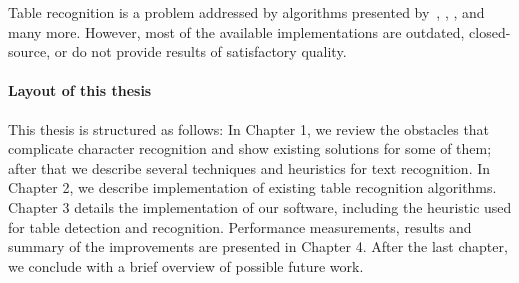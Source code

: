 Table recognition is a problem addressed by algorithms presented by~\citet{tableDetHeterogeneous}, \citet{TRecs}, \citet{MediumTable}, \citet{pdf2table} and many more. However, most of the available implementations are outdated, closed-source, or do not provide results of satisfactory quality.

\paragraph{Layout of this thesis} This thesis is structured as follows: In Chapter 1, we review the obstacles that complicate character recognition and show existing solutions for some of them; after that we describe several techniques and heuristics for text recognition. In Chapter 2, we describe implementation of existing table recognition algorithms. Chapter 3 details the implementation of our software, including the heuristic used for table detection and recognition. Performance measurements, results and summary of the improvements are presented in Chapter 4. After the last chapter, we conclude with a brief overview of possible future work.

